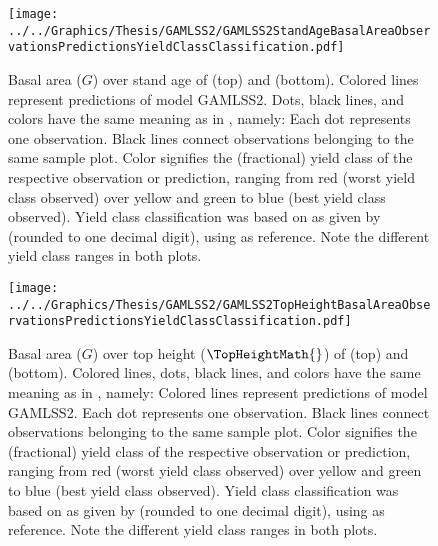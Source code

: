\begin{figure}[h]
  \centering
  \texttt{[image: ../../Graphics/Thesis/GAMLSS2/GAMLSS2StandAgeBasalAreaObservationsPredictionsYieldClassClassification.pdf]}
  \caption{Basal area (\(G\)) over stand age of \Beech{} (top) and \Spruce{} (bottom).  Colored lines represent predictions of model GAMLSS2.  Dots, black lines, and colors have the same meaning as in , namely:  Each dot represents one observation.  Black lines connect observations belonging to the same sample plot.  Color signifies the (fractional) yield class of the respective observation or prediction, ranging from red (worst yield class observed) over yellow and green to blue (best yield class observed).  Yield class classification was based on \ProductivityIndexText{} as given by  (rounded to one decimal digit), using  as reference.  Note the different yield class ranges in both plots.}
  \label{fig:GAMLSS2StandAgeBasalAreaObservationsPredictionsYieldClassClassification}
\end{figure}

\begin{figure}[h]
  \centering
  \texttt{[image: ../../Graphics/Thesis/GAMLSS2/GAMLSS2TopHeightBasalAreaObservationsPredictionsYieldClassClassification.pdf]}
  \caption{Basal area (\(G\)) over top height (\(\TopHeightMath{}\)) of \Beech{} (top) and \Spruce{} (bottom).  Colored lines, dots, black lines, and colors have the same meaning as in , namely:  Colored lines represent predictions of model GAMLSS2.  Each dot represents one observation.  Black lines connect observations belonging to the same sample plot.  Color signifies the (fractional) yield class of the respective observation or prediction, ranging from red (worst yield class observed) over yellow and green to blue (best yield class observed).  Yield class classification was based on \ProductivityIndexText{} as given by  (rounded to one decimal digit), using  as reference.  Note the different yield class ranges in both plots.}
  \label{fig:GAMLSS2TopHeightBasalAreaObservationsPredictionsYieldClassClassification}
\end{figure}

\clearpage{}

